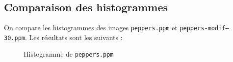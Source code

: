 \documentclass[french,a4paper,10pt]{article}
\begin{document}
    \subsection{Comparaison des histogrammes}\label{subsec:5.3}

    On compare les histogrammes des images \texttt{peppers.ppm} et
    \texttt{peppers-modif--30.ppm}.
    Les résultats sont les suivants :

    \begin{figure}[!htb]
        \centering
        \caption{Histogramme de \texttt{peppers.ppm}}\label{Fig:histo-peppers-luminance}
    \end{figure}
\end{document}
